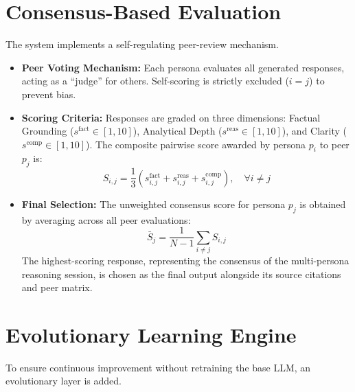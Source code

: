\section{Consensus-Based Evaluation}
\label{sec:consensus_evaluation}

The system implements a self-regulating peer-review mechanism.

\begin{itemize}
    \item \textbf{Peer Voting Mechanism:} Each persona evaluates all generated responses, acting as a “judge” for others. Self-scoring is strictly excluded ($i = j$) to prevent bias.
    
    \item \textbf{Scoring Criteria:} Responses are graded on three dimensions: Factual Grounding ($s^{\text{fact}} \in [1, 10]$), Analytical Depth ($s^{\text{reas}} \in [1, 10]$), and Clarity ($s^{\text{comp}} \in [1, 10]$). The composite pairwise score awarded by persona $p_i$ to peer $p_j$ is:
    \begin{equation}
    S_{i,j} = \frac{1}{3} \left( s_{i,j}^{\text{fact}} + s_{i,j}^{\text{reas}} + s_{i,j}^{\text{comp}} \right), \quad \forall i \neq j
    \end{equation}
    
    \item \textbf{Final Selection:} The unweighted consensus score for persona $p_j$ is obtained by averaging across all peer evaluations:
    \begin{equation}
    \bar{S}_j = \frac{1}{N-1} \sum_{i \neq j} S_{i,j}
    \end{equation}
    The highest-scoring response, representing the consensus of the multi-persona reasoning session, is chosen as the final output alongside its source citations and peer matrix.
\end{itemize}

\section{Evolutionary Learning Engine}
\label{sec:evolutionary_engine}

To ensure continuous improvement without retraining the base LLM, an evolutionary layer is added.

